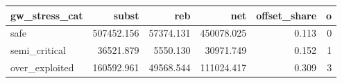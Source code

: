 \begin{tabular}{lrrrrr}
\toprule
gw_stress_cat & subst & reb & net & offset_share & o \\
\midrule
safe & 507452.156 & 57374.131 & 450078.025 & 0.113 & 0 \\
semi_critical & 36521.879 & 5550.130 & 30971.749 & 0.152 & 1 \\
over_exploited & 160592.961 & 49568.544 & 111024.417 & 0.309 & 3 \\
\bottomrule
\end{tabular}
